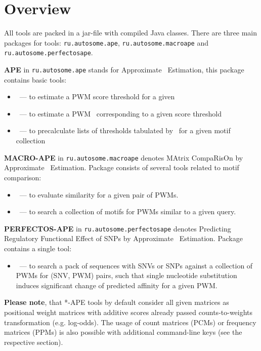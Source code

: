 \section{Overview}
All tools are packed in a jar-file with compiled Java classes. There are three main packages for tools:
\texttt{ru.autosome.ape}, \texttt{ru.autosome.macroape} and \texttt{ru.autosome.perfectosape}.

\textbf{APE} in \texttt{ru.autosome.ape} stands for Approximate \pvalue\ Estimation, this package contains basic tools:
\begin{itemize}
\item {}~--- to estimate a PWM score threshold for a given \pvalue
\item {}~--- to estimate a PWM \pvalue\ corresponding to a given score threshold
\item {}~--- to precalculate lists of thresholds tabulated by \pvalues\ for a given motif collection
\end{itemize}

\textbf{MACRO-APE} in \texttt{ru.autosome.macroape} denotes MAtrix CompaRisOn by Approximate \pvalue\ Estimation. Package consists of several tools related to motif comparison:
\begin{itemize}
\item {}~--- to evaluate similarity for a given pair of PWMs.
\item {}~--- to search a collection of motifs for PWMs similar to a given query.
\end{itemize}

\textbf{PERFECTOS-APE} in \texttt{ru.autosome.perfectosape} denotes Predicting Regulatory Functional Effect of SNPs by Approximate \pvalue\ Estimation. Package contains a single tool:
\begin{itemize}
\item{}~--- to search a pack of sequences with SNVs or SNPs against a collection of PWMs for (SNV, PWM) pairs, such that single nucleotide substitution induces significant change of predicted affinity for a given PWM.
\end{itemize}

\textbf{Please note}, that *-APE tools by default consider all given matrices as positional weight matrices with additive scores already passed counts-to-weights transformation (e.g. log-odds). The usage of count matrices (PCMs) or frequency matrices (PPMs) is also possible with additional command-line keys (see the respective section).

